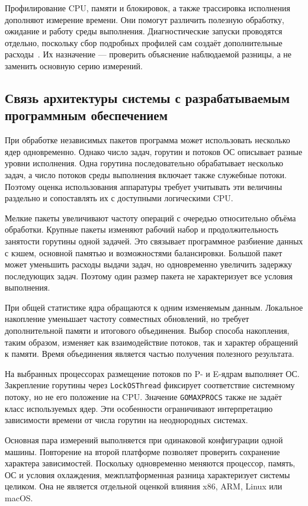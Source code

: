 Профилирование CPU, памяти и блокировок, а также трассировка исполнения дополняют измерение времени.
  Они помогут различить полезную обработку, ожидание и работу среды выполнения.
  Диагностические запуски проводятся отдельно, поскольку сбор подробных профилей сам создаёт
  дополнительные расходы~\cite{go_diagnostics}. Их назначение — проверить объяснение наблюдаемой
  разницы, а не заменить основную серию измерений.

\subsection{Связь архитектуры системы с разрабатываемым программным обеспечением}
\label{subsec:architecture-software-link}

При обработке независимых пакетов программа может использовать несколько ядер одновременно.
  Однако число задач, горутин и потоков ОС описывает разные уровни исполнения. Одна горутина
  последовательно обрабатывает несколько задач, а число потоков среды выполнения включает
  также служебные потоки. Поэтому оценка использования аппаратуры требует учитывать эти величины
  раздельно и сопоставлять их с доступными логическими CPU.

Мелкие пакеты увеличивают частоту операций с очередью относительно объёма обработки. Крупные
  пакеты изменяют рабочий набор и продолжительность занятости горутины одной задачей.
  Это связывает программное разбиение данных с кэшем, основной памятью и возможностями балансировки.
  Большой пакет может уменьшить расходы выдачи задач, но одновременно увеличить задержку
  последующих задач. Поэтому один размер пакета не характеризует все условия выполнения.

При общей статистике ядра обращаются к одним изменяемым данным. Локальное накопление уменьшает
  частоту совместных обновлений, но требует дополнительной памяти и итогового объединения.
  Выбор способа накопления, таким образом, изменяет как взаимодействие потоков, так и характер
  обращений к памяти. Время объединения является частью получения полезного результата.

На выбранных процессорах размещение потоков по P- и E-ядрам выполняет ОС. Закрепление горутины
  через \texttt{LockOSThread} фиксирует соответствие системному потоку, но не его положение на CPU.
  Значение \texttt{GOMAXPROCS} также не задаёт класс используемых ядер. Эти особенности ограничивают
  интерпретацию зависимости времени от числа горутин на неоднородных системах.

Основная пара измерений выполняется при одинаковой конфигурации одной машины. Повторение на второй
  платформе позволяет проверить сохранение характера зависимостей. Поскольку одновременно меняются
  процессор, память, ОС и условия охлаждения, межплатформенная разница характеризует системы целиком.
  Она не является отдельной оценкой влияния x86, ARM, Linux или macOS.


